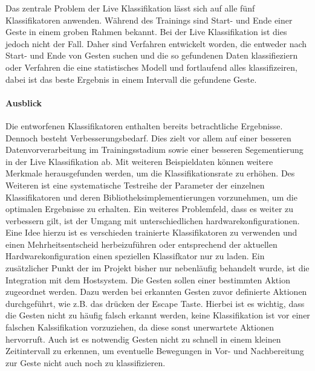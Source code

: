 Das zentrale Problem der Live Klassifikation lässt sich auf alle fünf
Klassifikatoren anwenden. Während des Trainings sind Start- und Ende einer Geste
in einem groben Rahmen bekannt. Bei der Live Klassifikation ist dies jedoch
nicht der Fall. Daher sind Verfahren entwickelt worden, die entweder nach Start-
und Ende von Gesten suchen und die so gefundenen Daten klassifieziern oder
Verfahren die eine statistisches Modell und fortlaufend alles klassifizeiren,
dabei ist das beste Ergebnis in einem Intervall die gefundene Geste.

\paragraph{Ausblick} 
Die entworfenen Klassifikatoren enthalten bereits betrachtliche Ergebnisse.
Dennoch besteht Verbesserungsbedarf. Dies zielt vor allem auf einer besseren
Datenvorverarbeitung im Trainingsstadium sowie einer besseren Segementierung in
der Live Klassifikation ab. Mit weiteren Beispieldaten können weitere Merkmale
herausgefunden werden, um die Klassifikationsrate zu erhöhen. Des Weiteren ist
eine systematische Testreihe der Parameter der einzelnen Klassifikatoren und
deren Bibliotheksimplementierungen vorzunehmen, um die optimalen Ergebnisse zu
erhalten. Ein weiteres Problemfeld, dass es weiter zu verbessern gilt, ist der
Umgang mit unterschiedlichen hardwarekonfigurationen. Eine Idee hierzu ist es
verschieden trainierte Klassifikatoren zu verwenden und einen Mehrheitsentscheid
herbeizuführen oder entsprechend der aktuellen Hardwarekonfiguration einen
speziellen Klassifkator nur zu laden. Ein zusätzlicher Punkt der im Projekt
bisher nur nebenläufig behandelt wurde, ist die Integration mit dem Hostsystem.
Die Gesten sollen einer bestimmten Aktion zugeordnet werden. Dazu werden bei
erkannten Gesten zuvor definierte Aktionen durchgeführt, wie z.B. das drücken
der Escape Taste. Hierbei ist es wichtig, dass die Gesten nicht zu häufig falsch
erkannt werden, keine Klassifikation ist vor einer falschen Kalssifikation
vorzuziehen, da diese sonst unerwartete Aktionen hervorruft. Auch ist es
notwendig Gesten nicht zu schnell in einem kleinen Zeitintervall zu erkennen, um
eventuelle Bewegungen in Vor- und Nachbereitung zur Geste nicht auch noch zu
klassifizieren.







